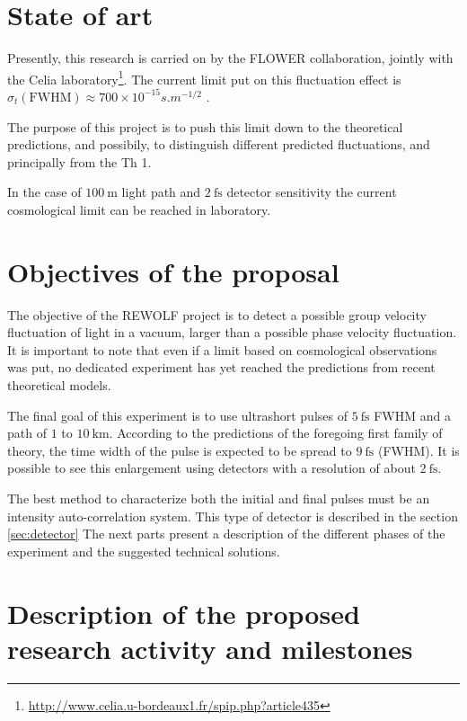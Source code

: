 \documentclass[9pt, a4, twoside]{article}
\begin{document}
\section{State of art}


Presently, this research is carried on by the FLOWER collaboration, jointly with the Celia laboratory\footnote{\url{http://www.celia.u-bordeaux1.fr/spip.php?article435}}.
The current limit put on this fluctuation effect is $\sigma_t(\mathrm{FWHM}) \approx 700 \times 10^{-15}s.m^{-1/2}$ \cite{cosmoobs}.

The purpose of this project is to push this limit down to the theoretical predictions, and possibily, to distinguish different predicted fluctuations, and principally from the Th 1.

In the case of $100~\mathrm{m}$ light path and $2~\mathrm{fs}$ detector sensitivity the current cosmological limit can be reached in laboratory.

\section{Objectives of the proposal}

The objective of the REWOLF project is to detect a possible group velocity fluctuation of light in a vacuum, larger than a possible phase velocity fluctuation. It is important to note that even if a limit based on cosmological observations was put, no dedicated experiment has yet reached the predictions from recent theoretical models.

The final goal of this experiment is to use ultrashort pulses of $5~\mathrm{fs}$ FWHM and a path of $1$ to $10~\mathrm{km}$. According to the predictions of the foregoing first family of theory, the time width of the pulse is expected to be spread to $9~\mathrm{fs}$ (FWHM). It is possible to see this enlargement using detectors with a resolution of about $2~\mathrm{fs}$.

The best method to characterize both the initial and final pulses must be an intensity auto-correlation system. This type of detector is described in the section \ref{sec:detector}
The next parts present a description of the different phases of the experiment and the suggested technical solutions.

\section{Description of the proposed research activity and milestones}
\end{document}
